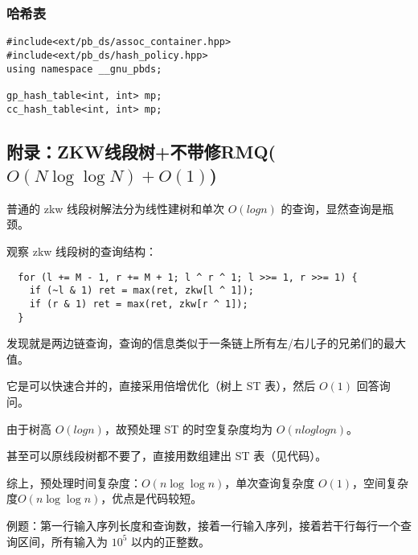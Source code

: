 \documentclass[]{article}
\begin{document}
\hypertarget{ux54c8ux5e0cux8868}{%
\subsubsection{哈希表}\label{ux54c8ux5e0cux8868}}

\begin{verbatim}
#include<ext/pb_ds/assoc_container.hpp>
#include<ext/pb_ds/hash_policy.hpp>
using namespace __gnu_pbds;

gp_hash_table<int, int> mp;
cc_hash_table<int, int> mp;
\end{verbatim}

\hypertarget{ux9644ux5f55zkwux7ebfux6bb5ux6811ux4e0dux5e26ux4feermqonlog-log-no1}{%
\subsection{\texorpdfstring{附录：ZKW线段树+不带修RMQ(\(O(N\log \log N)+O(1)\))}{附录：ZKW线段树+不带修RMQ(O(N\textbackslash log \textbackslash log N)+O(1))}}\label{ux9644ux5f55zkwux7ebfux6bb5ux6811ux4e0dux5e26ux4feermqonlog-log-no1}}

普通的 zkw 线段树解法分为线性建树和单次 \(O(logn)\)
的查询，显然查询是瓶颈。

观察 zkw 线段树的查询结构：

\begin{verbatim}
  for (l += M - 1, r += M + 1; l ^ r ^ 1; l >>= 1, r >>= 1) {
    if (~l & 1) ret = max(ret, zkw[l ^ 1]);
    if (r & 1) ret = max(ret, zkw[r ^ 1]);
  }
\end{verbatim}

发现就是两边链查询，查询的信息类似于一条链上所有左/右儿子的兄弟们的最大值。

它是可以快速合并的，直接采用倍增优化（树上 ST 表），然后 \(O(1)\)
回答询问。

由于树高 \(O(logn)\)，故预处理 ST 的时空复杂度均为 \(O(nloglogn)\)。

甚至可以原线段树都不要了，直接用数组建出 ST 表（见代码）。

综上，预处理时间复杂度：\(O(n\log \log n)\)，单次查询复杂度
\(O(1)\)，空间复杂度\(O(n\log⁡ \log⁡n)\)，优点是代码较短。

例题：第一行输入序列长度和查询数，接着一行输入序列，接着若干行每行一个查询区间，所有输入为
\(10^5\) 以内的正整数。
\end{document}
